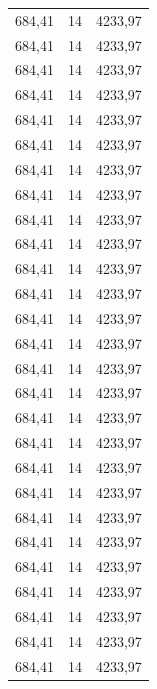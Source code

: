 \begin{center}
\begin{longtable}{|l|l|l|}
684,41            & 14               & 4233,97        \\
684,41            & 14               & 4233,97        \\
684,41            & 14               & 4233,97        \\
684,41            & 14               & 4233,97        \\
684,41            & 14               & 4233,97        \\
684,41            & 14               & 4233,97        \\
684,41            & 14               & 4233,97        \\
684,41            & 14               & 4233,97        \\
684,41            & 14               & 4233,97        \\
684,41            & 14               & 4233,97        \\
684,41            & 14               & 4233,97        \\
684,41            & 14               & 4233,97        \\
684,41            & 14               & 4233,97        \\
684,41            & 14               & 4233,97        \\
684,41            & 14               & 4233,97        \\
684,41            & 14               & 4233,97        \\
684,41            & 14               & 4233,97        \\
684,41            & 14               & 4233,97        \\
684,41            & 14               & 4233,97        \\
684,41            & 14               & 4233,97        \\
684,41            & 14               & 4233,97        \\
684,41            & 14               & 4233,97        \\
684,41            & 14               & 4233,97        \\
684,41            & 14               & 4233,97        \\
684,41            & 14               & 4233,97        \\
684,41            & 14               & 4233,97        \\
684,41            & 14               & 4233,97        \\

\end{longtable}
\end{center}
